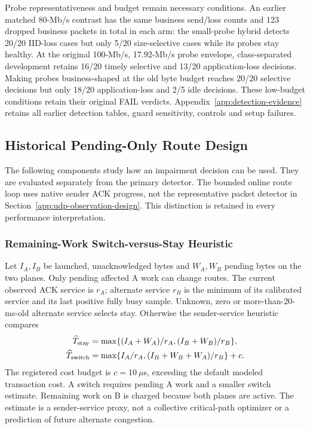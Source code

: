 \documentclass[sigconf]{acmart}
\begin{document}
Probe representativeness and budget remain necessary conditions.
An earlier matched 80-Mb/s contrast has the same business send/loss counts
and 123 dropped business packets in total in each arm: the small-probe
hybrid detects 20/20 IID-loss cases but only 5/20 size-selective cases while
its probes stay healthy. At the original 100-Mb/s, 17.92-Mb/s probe envelope,
class-separated development retains 16/20 timely selective and 13/20
application-loss decisions. Making probes business-shaped at the old byte
budget reaches 20/20 selective decisions but only 18/20 application-loss
and 2/5 idle decisions. These low-budget conditions retain their original
FAIL verdicts. Appendix~\ref{app:detection-evidence} retains
all earlier detection tables, guard sensitivity, controls and setup failures.

\subsection{Historical Pending-Only Route Design}
\label{app:legacy-recovery-design}
The following components study how an impairment decision can be used.
They are evaluated separately from the primary detector. The bounded online
route loop uses native sender ACK progress, not the representative packet
detector in Section~\ref{app:udp-observation-design}. This distinction is retained in
every performance interpretation.

\subsubsection{Remaining-Work Switch-versus-Stay Heuristic}
Let $I_A,I_B$ be launched, unacknowledged bytes and $W_A,W_B$ pending
bytes on the two planes. Only pending affected A work can change routes.
The current observed ACK service is $r_A$; alternate service $r_B$ is the
minimum of its calibrated service and its last positive fully busy sample.
Unknown, zero or more-than-20-ms-old alternate service selects stay.
Otherwise the sender-service heuristic compares
\begin{align*}
\widehat T_{\rm stay}&=\max\{(I_A+W_A)/r_A,(I_B+W_B)/r_B\},\\
\widehat T_{\rm switch}&=\max\{I_A/r_A,(I_B+W_B+W_A)/r_B\}+c.
\end{align*}
The registered cost budget is $c=10~\mu$s, exceeding the default modeled
transaction cost. A switch requires pending A work and a smaller switch
estimate. Remaining work on B is charged because both planes are active.
The estimate is a sender-service proxy, not a collective critical-path
optimizer or a prediction of future alternate congestion.
\end{document}
